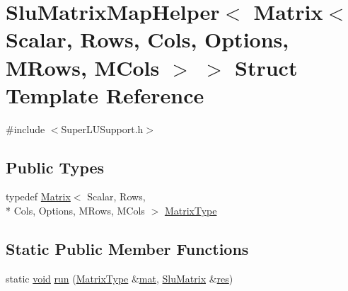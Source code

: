 \hypertarget{struct_slu_matrix_map_helper_3_01_matrix_3_01_scalar_00_01_rows_00_01_cols_00_01_options_00_01_m_rows_00_01_m_cols_01_4_01_4}{\section{Slu\-Matrix\-Map\-Helper$<$ Matrix$<$ Scalar, Rows, Cols, Options, M\-Rows, M\-Cols $>$ $>$ Struct Template Reference}
\label{struct_slu_matrix_map_helper_3_01_matrix_3_01_scalar_00_01_rows_00_01_cols_00_01_options_00_01_m_rows_00_01_m_cols_01_4_01_4}
}


{\ttfamily \#include $<$Super\-L\-U\-Support.\-h$>$}

\subsection*{Public Types}
\begin{DoxyCompactItemize}
\item 
typedef \hyperlink{class_matrix}{Matrix}$<$ Scalar, Rows, \\*
Cols, Options, M\-Rows, M\-Cols $>$ \hyperlink{struct_slu_matrix_map_helper_3_01_matrix_3_01_scalar_00_01_rows_00_01_cols_00_01_options_00_01_m_rows_00_01_m_cols_01_4_01_4_a7ca362900dab58b2714e39a32fe686d5}{Matrix\-Type}
\end{DoxyCompactItemize}
\subsection*{Static Public Member Functions}
\begin{DoxyCompactItemize}
\item 
static \hyperlink{group___u_a_v_objects_plugin_ga444cf2ff3f0ecbe028adce838d373f5c}{void} \hyperlink{struct_slu_matrix_map_helper_3_01_matrix_3_01_scalar_00_01_rows_00_01_cols_00_01_options_00_01_m_rows_00_01_m_cols_01_4_01_4_a84b45f40c1786dbb6620a84cf8eef987}{run} (\hyperlink{struct_slu_matrix_map_helper_3_01_matrix_3_01_scalar_00_01_rows_00_01_cols_00_01_options_00_01_m_rows_00_01_m_cols_01_4_01_4_a7ca362900dab58b2714e39a32fe686d5}{Matrix\-Type} \&\hyperlink{uavobjecttemplate_8m_a16a51e808b16c46bbfd36da2e37cd123}{mat}, \hyperlink{struct_slu_matrix}{Slu\-Matrix} \&\hyperlink{glext_8h_a1dbb21208b9047cc8031ca9c840d3c2f}{res})
\end{DoxyCompactItemize}


